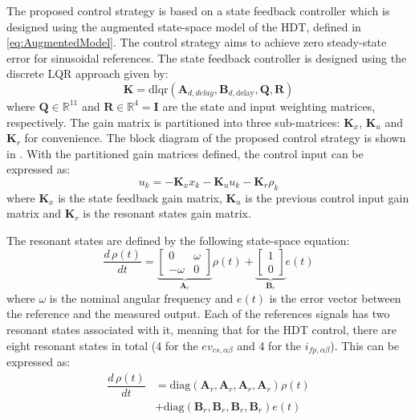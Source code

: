 The proposed control strategy is based on a state feedback controller which is designed using the augmented state-space model of the HDT, defined in \eqref{eq:AugmentedModel}. The control strategy aims to achieve zero steady-state error for sinusoidal references. The state feedback controller is designed using the discrete LQR approach given by:
\begin{equation}
    \mathbf{K} = \text{dlqr}(\mathbf{A}_{d,delay}, \mathbf{B}_{d,\text{delay}}, \mathbf{Q}, \mathbf{R})
\end{equation}
where $\mathbf{Q}\in\mathbb{R}^{11}$ and $\mathbf{R}\in\mathbb{R}^4 = \mathbf{I}$ are the state and input weighting matrices, respectively. The gain matrix is partitioned into three sub-matrices: $\mathbf{K}_x$, $\mathbf{K}_u$ and $\mathbf{K}_r$ for convenience. The block diagram of the proposed control strategy is shown in . With the partitioned gain matrices defined, the control input can be expressed as:
\begin{equation}
    u_k = -\mathbf{K}_x
    x_k - \mathbf{K}_u u_k - \mathbf{K}_r \rho_k
\end{equation}
where $\mathbf{K}_x$ is the state feedback gain matrix, $\mathbf{K}_u$ is the previous control input gain matrix and $\mathbf{K}_r$ is the resonant states gain matrix.

The resonant states are defined by the following state-space equation:
\begin{equation}
    \dfrac{d\,\rho(t)}{dt} = 
    \underbrace{
    \begin{bmatrix}
        0 & \omega \\
        -\omega & 0
    \end{bmatrix}
    }_{\mathbf{A}_r}
    \rho(t) + 
    \underbrace{
    \begin{bmatrix}
        1\\
        0
    \end{bmatrix}
    }_{\mathbf{B}_r}
    e(t)
\end{equation}
where $\omega$ is the nominal angular frequency and $e(t)$ is the error vector between the reference and the measured output. Each of the references signals has two resonant states associated with it, meaning that for the HDT control, there are eight resonant states in total (4 for the $ev_{cs,\alpha\beta}$ and 4 for the $i_{fp,\alpha\beta}$). This can be expressed as:
\begin{align}
    \dfrac{d\,\rho(t)}{dt} &= \text{diag}(\mathbf{A}_r, \mathbf{A}_r, \mathbf{A}_r, \mathbf{A}_r)\rho(t)\\
    &+ \text{diag}(\mathbf{B}_r, \mathbf{B}_r, \mathbf{B}_r, \mathbf{B}_r)e(t)
\end{align}

